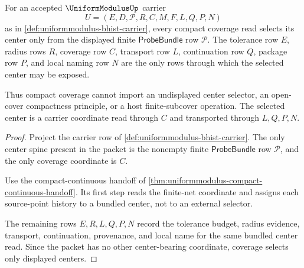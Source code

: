 \begin{theorem}
\label{thm:uniformmodulus-finite-net-center-coverage-obligation}
For an accepted $\UniformModulusUp$ carrier
$$
U=(E,D,\mathcal{P},R,C,M,F,L,Q,P,N)
$$
as in \autoref{def:uniformmodulus-bhist-carrier}, every compact coverage read selects its center only from the displayed finite $\mathsf{ProbeBundle}$ row $\mathcal{P}$. The tolerance row $E$, radius rows $R$, coverage row $C$, transport row $L$, continuation row $Q$, package row $P$, and local naming row $N$ are the only rows through which the selected center may be exposed.

Thus compact coverage cannot import an undisplayed center selector, an open-cover compactness principle, or a host finite-subcover operation. The selected center is a carrier coordinate read through $C$ and transported through $L,Q,P,N$.
\end{theorem}
\begin{proof}
Project the carrier row of \autoref{def:uniformmodulus-bhist-carrier}. The only center spine present in the packet is the nonempty finite $\mathsf{ProbeBundle}$ row $\mathcal{P}$, and the only coverage coordinate is $C$.

Use the compact-continuous handoff of \autoref{thm:uniformmodulus-compact-continuous-handoff}. Its first step reads the finite-net coordinate and assigns each source-point history to a bundled center, not to an external selector.

The remaining rows $E,R,L,Q,P,N$ record the tolerance budget, radius evidence, transport, continuation, provenance, and local name for the same bundled center read. Since the packet has no other center-bearing coordinate, coverage selects only displayed centers.
\end{proof}

